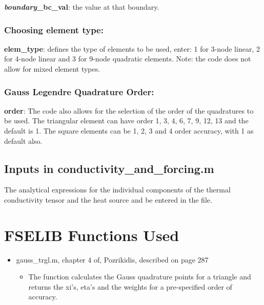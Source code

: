 \textbf{\textit{boundary}\_bc\_val}: the value at that boundary.

\subsubsection*{Choosing element type:}
\textbf{elem\_type}: defines the type of elements to be used, enter: 1 for 3-node linear, 2 for 4-node linear and 3 for 9-node quadratic elements. Note: the code does not allow for mixed element types.

\subsubsection*{Gauss Legendre Quadrature Order:}
\textbf{order}: The code also allows for the selection of the order of the quadratures to be used. The triangular element can have order 1, 3, 4, 6, 7, 9, 12, 13 and the default is 1. The square elements can be 1, 2, 3 and 4 order accuracy, with 1 as default also.

\subsection*{Inputs in conductivity\_and\_forcing.m}
\par The analytical expressions for the individual components of the thermal conductivity tensor and the heat source and be entered in the file.

\section*{FSELIB Functions Used}
\begin{itemize}
\item gauss\_trgl.m, chapter 4 of, Pozrikidis, described on page 287
	\begin{itemize}
	\item The function calculates the Gauss quadrature points for a triangle and returns the xi's, eta's and the
	      weights for a pre-specified order of accuracy.
	\end{itemize}
\end{itemize}